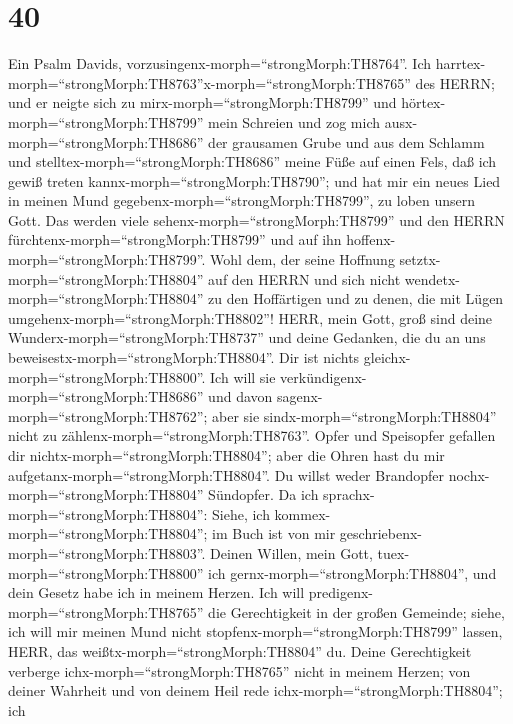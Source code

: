 \hypertarget{section-39}{%
\section{40}\label{section-39}}

 Ein Psalm Davids,
vorzusingenx-morph=``strongMorph:TH8764''. Ich
harrtex-morph=``strongMorph:TH8763''x-morph=``strongMorph:TH8765'' des
HERRN; und er neigte sich zu mirx-morph=``strongMorph:TH8799'' und
hörtex-morph=``strongMorph:TH8799'' mein Schreien  und zog
mich ausx-morph=``strongMorph:TH8686'' der grausamen Grube und aus dem
Schlamm und stelltex-morph=``strongMorph:TH8686'' meine Füße auf einen
Fels, daß ich gewiß treten kannx-morph=``strongMorph:TH8790'';
 und hat mir ein neues Lied in meinen Mund
gegebenx-morph=``strongMorph:TH8799'', zu loben unsern Gott. Das werden
viele sehenx-morph=``strongMorph:TH8799'' und den HERRN
fürchtenx-morph=``strongMorph:TH8799'' und auf ihn
hoffenx-morph=``strongMorph:TH8799''.  Wohl dem, der seine
Hoffnung setztx-morph=``strongMorph:TH8804'' auf den HERRN und sich
nicht wendetx-morph=``strongMorph:TH8804'' zu den Hoffärtigen und zu
denen, die mit Lügen umgehenx-morph=``strongMorph:TH8802''! 
HERR, mein Gott, groß sind deine Wunderx-morph=``strongMorph:TH8737''
und deine Gedanken, die du an uns
beweisestx-morph=``strongMorph:TH8804''. Dir ist nichts
gleichx-morph=``strongMorph:TH8800''. Ich will sie
verkündigenx-morph=``strongMorph:TH8686'' und davon
sagenx-morph=``strongMorph:TH8762''; aber sie
sindx-morph=``strongMorph:TH8804'' nicht zu
zählenx-morph=``strongMorph:TH8763''.  Opfer und Speisopfer
gefallen dir nichtx-morph=``strongMorph:TH8804''; aber die Ohren hast du
mir aufgetanx-morph=``strongMorph:TH8804''. Du willst weder Brandopfer
nochx-morph=``strongMorph:TH8804'' Sündopfer.  Da ich
sprachx-morph=``strongMorph:TH8804'': Siehe, ich
kommex-morph=``strongMorph:TH8804''; im Buch ist von mir
geschriebenx-morph=``strongMorph:TH8803''.  Deinen Willen,
mein Gott, tuex-morph=``strongMorph:TH8800'' ich
gernx-morph=``strongMorph:TH8804'', und dein Gesetz habe ich in meinem
Herzen.  Ich will predigenx-morph=``strongMorph:TH8765'' die
Gerechtigkeit in der großen Gemeinde; siehe, ich will mir meinen Mund
nicht stopfenx-morph=``strongMorph:TH8799'' lassen, HERR, das
weißtx-morph=``strongMorph:TH8804'' du.  Deine
Gerechtigkeit verberge ichx-morph=``strongMorph:TH8765'' nicht in meinem
Herzen; von deiner Wahrheit und von deinem Heil rede
ichx-morph=``strongMorph:TH8804''; ich

